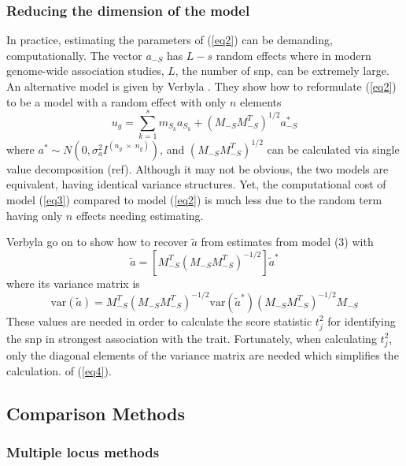 \documentclass{nature}
\begin{document}
\subsubsection{Reducing the dimension of the model}
In practice, estimating the parameters of (\ref{eq2}) can be demanding, computationally. 
The vector $a_{-S}$ has $L-s$ random effects where in modern genome-wide association studies, 
$L$, the number of snp, can be extremely large.  An alternative model is given by 
Verbyla \cite{verbyla2012rwgaim,verbyla2014whole}. 
They show how to reformulate (\ref{eq2}) to be a model with a random effect with only $n$ elements
\begin{equation}
\label{eq3}
u_g = \sum_{k=1}^s  m_{S_k} a_{S_k} + (M_{-S} M_{-S}^T)^{1/2} a^*_{-S}
\end{equation}
where $a^* \sim N(0, \sigma_a^2 I^{(n_g \; \times \;  n_g)})$, and 
$(M_{-S} M_{-S}^T)^{1/2}$ can be calculated via single value decomposition (ref).  
Although it may not be obvious, the two models are equivalent, 
having identical variance structures. Yet, the computational cost of model (\ref{eq3}) compared to 
model (\ref{eq2}) is much less due to the random term having only $n$ effects needing estimating. 

Verbyla \cite{verbyla2012rwgaim,verbyla2014whole} go on to show how to recover $\widetilde{a}$ from estimates from model (3) with 
\begin{equation}
\widetilde{a} = \left [ M_{-S}^T (M_{-S} M_{-S}^T)^{-1/2} \right ] \widetilde{a}^*
\end{equation}
where its variance matrix is
\begin{equation}
\label{eq4}
\textrm{var}(\widetilde{a}) = M_{-S}^T (M_{-S} M_{-S}^T)^{-1/2} \textrm{var}(\widetilde{a}^*) (M_{-S} M_{-S}^T)^{-1/2} M_{-S}
\end{equation}
These values are needed in order to calculate the score statistic $t_j^2$ for identifying the snp in strongest association with the trait. 
Fortunately, when calculating $t_j^2$, only the diagonal elements of the variance matrix are needed which simplifies the  calculation. 
of (\ref{eq4}). 



\subsection{Comparison Methods}

\subsubsection{Multiple locus methods}
\end{document}
